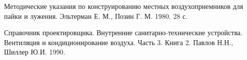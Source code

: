    Методические указания по конструированию
                                        местных воздухоприемников для пайки и лужения.
                                        Эльтерман Е. М., Позин Г. М.
                                        1980. 28 с.

  Справочник проектировщика.
                                            Внутренние санитарно-технические устройства.
                                            Вентиляция и кондиционирование воздуха.
                                            Часть 3. Книга 2.
                                            Павлов Н.Н., Шиллер Ю.И.
                                            1990.
